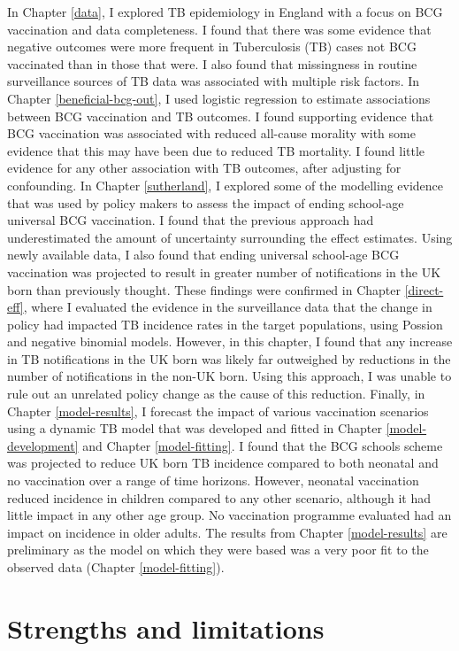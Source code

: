 \documentclass[11pt,twoside]{bristolthesis}
\begin{document}
  In Chapter \ref{data}, I explored TB epidemiology in England with a focus on BCG vaccination and data completeness. I found that there was some evidence that negative outcomes were more frequent in Tuberculosis (TB) cases not BCG vaccinated than in those that were. I also found that missingness in routine surveillance sources of TB data was associated with multiple risk factors. In Chapter \ref{beneficial-bcg-out}, I used logistic regression to estimate associations between BCG vaccination and TB outcomes. I found supporting evidence that BCG vaccination was associated with reduced all-cause morality with some evidence that this may have been due to reduced TB mortality. I found little evidence for any other association with TB outcomes, after adjusting for confounding. In Chapter \ref{sutherland}, I explored some of the modelling evidence that was used by policy makers to assess the impact of ending school-age universal BCG vaccination. I found that the previous approach had underestimated the amount of uncertainty surrounding the effect estimates. Using newly available data, I also found that ending universal school-age BCG vaccination was projected to result in greater number of notifications in the UK born than previously thought. These findings were confirmed in Chapter \ref{direct-eff}, where I evaluated the evidence in the surveillance data that the change in policy had impacted TB incidence rates in the target populations, using Possion and negative binomial models. However, in this chapter, I found that any increase in TB notifications in the UK born was likely far outweighed by reductions in the number of notifications in the non-UK born. Using this approach, I was unable to rule out an unrelated policy change as the cause of this reduction. Finally, in Chapter \ref{model-results}, I forecast the impact of various vaccination scenarios using a dynamic TB model that was developed and fitted in Chapter \ref{model-development} and Chapter \ref{model-fitting}. I found that the BCG schools scheme was projected to reduce UK born TB incidence compared to both neonatal and no vaccination over a range of time horizons. However, neonatal vaccination reduced incidence in children compared to any other scenario, although it had little impact in any other age group. No vaccination programme evaluated had an impact on incidence in older adults. The results from Chapter \ref{model-results} are preliminary as the model on which they were based was a very poor fit to the observed data (Chapter \ref{model-fitting}).
  
  \hypertarget{strengths-and-limitations}{%
  \section{Strengths and limitations}\label{strengths-and-limitations}}
  
\end{document}
